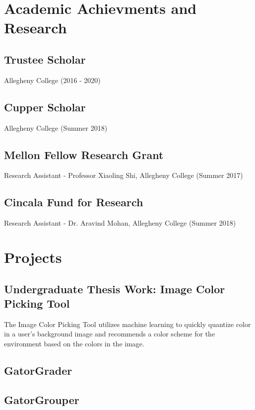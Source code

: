 \documentclass[12pt]{article}
\begin{document}
\section*{Academic Achievments and Research}

\begin{multicols}{2}
\subsection*{Trustee Scholar}
Allegheny College (2016 - 2020)

\subsection*{Cupper Scholar}
Allegheny College (Summer 2018)

\subsection*{Mellon Fellow Research Grant}
Research Assistant - Professor Xiaoling Shi, Allegheny College (Summer 2017)

\subsection*{Cincala Fund for Research}
Research Assistant - Dr. Aravind Mohan, Allegheny College (Summer 2018)

\end{multicols}

\section*{Projects}

\subsection*{Undergraduate Thesis Work: Image Color Picking Tool}
The Image Color Picking Tool utilizes machine learning to quickly quantize color
in a user's background image and recommends a color scheme for the environment
based on the colors in the image.

\begin{multicols}{2}
\subsection*{GatorGrader}
\vfill\null

\subsection*{GatorGrouper}
\vfill\null

\end{multicols}
\end{document}
